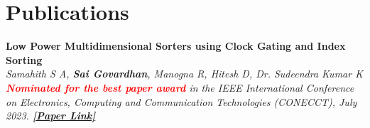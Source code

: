\section{\sc Publications}

{\bf{Low Power Multidimensional Sorters using Clock Gating and Index Sorting}} \\
\textit{Samahith S A, {\bf{Sai Govardhan}}, Manogna R, Hitesh D, Dr. Sudeendra Kumar K \\
  {\bf \textcolor{red} {Nominated for the best paper award}} in the IEEE International Conference on Electronics, Computing and Communication Technologies (CONECCT), July 2023.  
  {\bf \href{https://ieeexplore.ieee.org/document/10234758}{[Paper Link]}}}

\endinput
